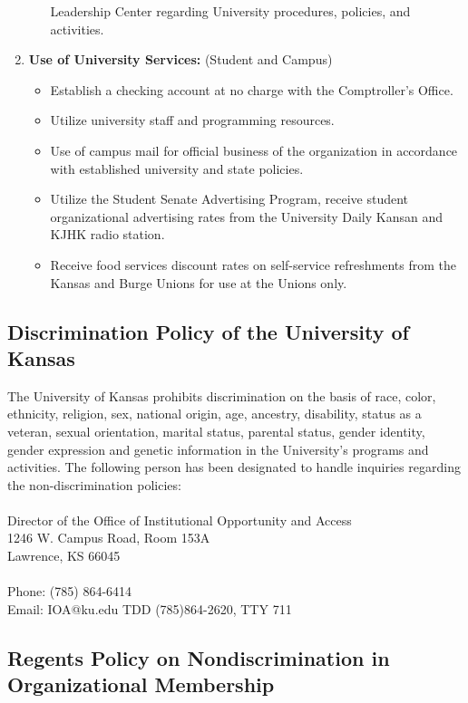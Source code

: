 \begin{enumerate}
\begin{itemize}
          Leadership Center regarding University procedures, policies, and
          activities.
  \end{itemize}
  \item \textbf{Use of University Services:} (Student and Campus)
  \begin{itemize}
    \item Establish a checking account at no charge with the Comptroller's
          Office.
    \item Utilize university staff and programming resources.
    \item Use of campus mail for official business of the organization in
          accordance with established university and state policies.
    \item Utilize the Student Senate Advertising Program, receive student
          organizational advertising rates from the University Daily Kansan and
          KJHK radio station.
    \item Receive food services discount rates on self-service refreshments from
          the Kansas and Burge Unions for use at the Unions only.
  \end{itemize}
\end{enumerate}


\subsection{Discrimination Policy of the University of Kansas}

The University of Kansas prohibits discrimination on the basis of race, color,
ethnicity, religion, sex, national origin, age, ancestry, disability, status as
a veteran, sexual orientation, marital status, parental status, gender identity,
gender expression and genetic information in the University\rq s programs and
activities. The following person has been designated to handle inquiries
regarding the non-discrimination policies:
\\
\\
Director of the Office of Institutional Opportunity and Access\\
1246 W. Campus Road, Room 153A\\
Lawrence, KS 66045\\
\\
Phone: (785) 864-6414\\
Email: IOA@ku.edu
TDD (785)864-2620, TTY 711

\subsection{Regents Policy on Nondiscrimination in Organizational Membership}

